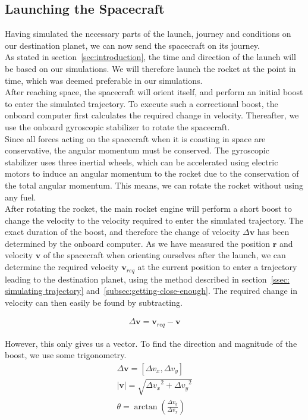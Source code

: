 \documentclass[reprint,english,notitlepage]{revtex4-2}
\begin{document}
\subsection{Launching the Spacecraft}\label{subsec:launching-the-spacecraft}
    Having simulated the necessary parts of the launch, journey and conditions on our destination planet, we can now send the spacecraft on its journey.\\
    As stated in section~\ref{sec:introduction}, the time and direction of the launch will be based on our simulations.
    We will therefore launch the rocket at the point in time, which was deemed preferable in our simulations.\\

    After reaching space, the spacecraft will orient itself, and perform an initial boost to enter the simulated trajectory.
    To execute such a correctional boost, the onboard computer first calculates the required change in velocity.
    Thereafter, we use the onboard gyroscopic stabilizer to rotate the spacecraft.\\
    Since all forces acting on the spacecraft when it is coasting in space are conservative, the angular momentum must be conserved.
    The gyroscopic stabilizer uses three inertial wheels, which can be accelerated using electric motors to induce an angular momentum to the rocket due to the conservation of the total angular momentum.
    This means, we can rotate the rocket without using any fuel.\\
    After rotating the rocket, the main rocket engine will perform a short boost to change the velocity to the velocity required to enter the simulated trajectory.
    The exact duration of the boost, and therefore the change of velocity $\Delta \textbf{v}$ has been determined by the onboard computer.
    As we have measured the position $ \textbf{r}$ and velocity $\textbf{v}$ of the spacecraft when orienting ourselves after the launch, we can determine the required velocity $ \textbf{v}_{req}$ at the current position to enter a trajectory leading to the destination planet, using the method described in section~\ref{ssec: simulating trajectory} and~\ref{subsec:getting-close-enough}.
    The required change in velocity can then easily be found by subtracting.

    \begin{align*}
        \Delta\textbf{v} = \textbf{v}_{req} - \textbf{v}
    \end{align*}

    However, this only gives us a vector.
    To find the direction and magnitude of the boost, we use some trigonometry.
    \begin{align*}
        \Delta\textbf{v} = [\Delta v_x, \Delta v_y]\\
        |\textbf{v}| = \sqrt{{\Delta v_x}^2 + {\Delta v_y}^2}\\
        \theta = \arctan \left(\frac{\Delta v_y}{\Delta v_x}\right)
    \end{align*}
\end{document}
